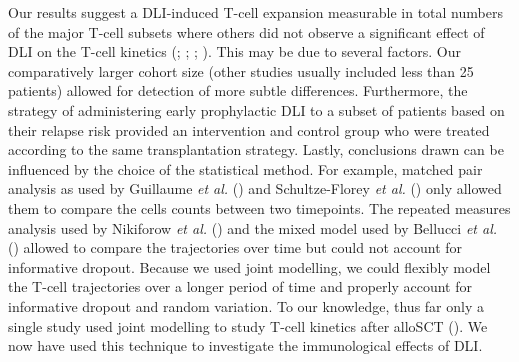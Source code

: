 \documentclass[
  letterpaper,
  DIV=11,
  numbers=noendperiod]{scrreprt}
\begin{document}
Our results suggest a DLI-induced T-cell expansion measurable in total
numbers of the major T-cell subsets where others did not observe a
significant effect of DLI on the T-cell kinetics
(;
;
;
). This may be due to several factors. Our
comparatively larger cohort size (other studies usually included less
than 25 patients) allowed for detection of more subtle differences.
Furthermore, the strategy of administering early prophylactic DLI to a
subset of patients based on their relapse risk provided an intervention
and control group who were treated according to the same transplantation
strategy. Lastly, conclusions drawn can be influenced by the choice of
the statistical method. For example, matched pair analysis as used by
Guillaume \emph{et al.}
() and
Schultze-Florey \emph{et al.}
() only
allowed them to compare the cells counts between two timepoints. The
repeated measures analysis used by Nikiforow \emph{et al.}
() and the mixed model
used by Bellucci \emph{et al.}
()
allowed to compare the trajectories over time but could not account for
informative dropout. Because we used joint modelling, we could flexibly
model the T-cell trajectories over a longer period of time and properly
account for informative dropout and random variation. To our knowledge,
thus far only a single study used joint modelling to study T-cell
kinetics after alloSCT
(). We now have used this technique to investigate
the immunological effects of DLI.
\end{document}
